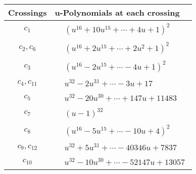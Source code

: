 \documentclass[1p]{elsarticle_modified}
\theoremstyle{definition}
\begin{document}
\begin{tabular}{m{50pt}|m{274pt}}
Crossings & \hspace{64pt}u-Polynomials at each crossing \\
\hline $$\begin{aligned}c_{1}\end{aligned}$$&$\begin{aligned}
&(u^{16}+10 u^{15}+\cdots+4 u+1)^{2}
\end{aligned}$\\
\hline $$\begin{aligned}c_{2},c_{6}\end{aligned}$$&$\begin{aligned}
&(u^{16}+2 u^{15}+\cdots+2 u^2+1)^{2}
\end{aligned}$\\
\hline $$\begin{aligned}c_{3}\end{aligned}$$&$\begin{aligned}
&(u^{16}-2 u^{15}+\cdots-4 u+1)^{2}
\end{aligned}$\\
\hline $$\begin{aligned}c_{4},c_{11}\end{aligned}$$&$\begin{aligned}
&u^{32}-2 u^{31}+\cdots-3 u+17
\end{aligned}$\\
\hline $$\begin{aligned}c_{5}\end{aligned}$$&$\begin{aligned}
&u^{32}-20 u^{30}+\cdots+147 u+11483
\end{aligned}$\\
\hline $$\begin{aligned}c_{7}\end{aligned}$$&$\begin{aligned}
&(u-1)^{32}
\end{aligned}$\\
\hline $$\begin{aligned}c_{8}\end{aligned}$$&$\begin{aligned}
&(u^{16}-5 u^{15}+\cdots-10 u+4)^{2}
\end{aligned}$\\
\hline $$\begin{aligned}c_{9},c_{12}\end{aligned}$$&$\begin{aligned}
&u^{32}+5 u^{31}+\cdots-40346 u+7837
\end{aligned}$\\
\hline $$\begin{aligned}c_{10}\end{aligned}$$&$\begin{aligned}
&u^{32}-10 u^{30}+\cdots-52147 u+13057
\end{aligned}$\\
\hline
\end{tabular}\\~\\
\end{document}
